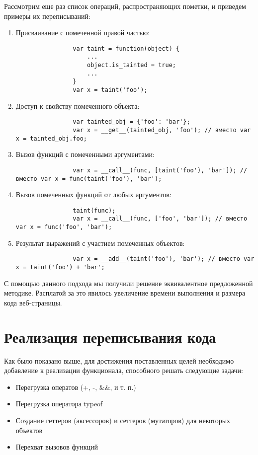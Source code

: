 	Рассмотрим еще раз список операций, распространяющих пометки, и приведем примеры их переписываний:
	\begin{enumerate}
		\item Присваивание с помеченной правой частью:
			\begin{lstlisting}
				var taint = function(object) {
					...
					object.is_tainted = true;
					...
				}
				var x = taint('foo');
			\end{lstlisting}
		\item Доступ к свойству помеченного объекта: 
			\begin{lstlisting}
				var tainted_obj = {'foo': 'bar'}; 
				var x = __get__(tainted_obj, 'foo'); // вместо var x = tainted_obj.foo; 
			\end{lstlisting}
		\item Вызов функций с помеченными аргументами:
			\begin{lstlisting}
				var x = __call__(func, [taint('foo'), 'bar']); // вместо var x = func(taint('foo'), 'bar');
			\end{lstlisting}
		\item Вызов помеченных функций от любых аргументов:
			\begin{lstlisting}
				taint(func);
				var x = __call__(func, ['foo', 'bar']); // вместо var x = func('foo', 'bar');
			\end{lstlisting}
		\item Результат выражений с участием помеченных объектов:
			\begin{lstlisting}
				var x = __add__(taint('foo'), 'bar'); // вместо var x = taint('foo') + 'bar';
			\end{lstlisting}
	\end{enumerate}

	С помощью данного подхода мы получили решение эквивалентное предложенной методике. Расплатой за это явилось увеличение времени выполнения и размера кода веб-страницы.

\section{Реализация переписывания кода}
Как было показано выше, для достижения поставленных целей необходимо добавление к реализации функционала, способного решать следующие задачи:

\begin{itemize}
	\item Перегрузка оператов (+, -, \&\&, и т. п.)
	\item Перегрузка оператора typeof
	\item Создание геттеров (аксессоров) и сеттеров (мутаторов) для некоторых объектов
	\item Перехват вызовов функций
\end{itemize}


